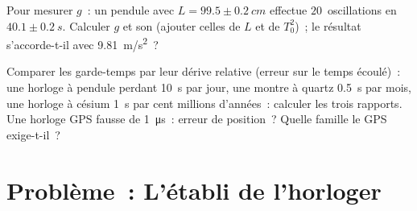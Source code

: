 \begin{exercise}[$\star\star\star$]\label{exo:g12:oscillators-and-time:14}
Pour mesurer $g$~: un pendule avec $L = 99.5 \pm \qty{0.2}{cm}$
effectue $20$~oscillations en $40.1 \pm \qty{0.2}{s}$. Calculer $g$
et son  (ajouter celles de $L$ et de
$T_0^2$)~; le résultat s'accorde-t-il avec \qty{9.81}{m/s^2}~?
\end{exercise}

\begin{exercise}[$\star\star\star$]\label{exo:g12:oscillators-and-time:15}
Comparer les garde-temps par leur dérive relative (erreur sur le
temps écoulé)~: une horloge à pendule perdant \qty{10}{s} par jour,
une montre à quartz \qty{0.5}{s} par mois, une horloge à césium
\qty{1}{s} par cent millions d'années~: calculer les trois rapports.
Une horloge GPS fausse de \qty{1}{\micro s}~: erreur de position~?
Quelle famille le GPS exige-t-il~?
\end{exercise}

\section{Problème~: L'établi de l'horloger}

